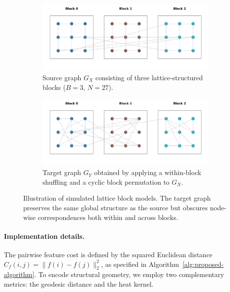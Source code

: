 \documentclass{article}
\begin{document}
\begin{figure}[t]
	\centering
	\begin{subfigure}{\textwidth}
		\includegraphics[width=\textwidth]{../simulation/source_lattice_blocks.png}
		\caption{Source graph $G_X$ consisting of three lattice-structured blocks ($B=3$, $N=27$).}
		\label{fig:data-example-source}
	\end{subfigure}
	\begin{subfigure}{\textwidth}
		\includegraphics[width=\textwidth]{../simulation/target_lattice_blocks.png}
		\caption{Target graph $G_Y$ obtained by applying a within-block shuffling and a cyclic block permutation to $G_X$.}
		\label{fig:data-example-target}
	\end{subfigure}
	\caption{Illustration of simulated lattice block models. The target graph preserves the same global structure as the source but obscures node-wise correspondences both within and across blocks.}
	\label{fig:data-example}
\end{figure}

\paragraph{Implementation details.}
The pairwise feature cost is defined by the squared Euclidean distance $C_f(i,j) = \|f(i) - f(j)\|_2^2$, as specified in Algorithm~\ref{alg:proposed-algorithm}. To encode structural geometry, we employ two complementary metrics: the geodesic distance and the heat kernel. 
\end{document}
